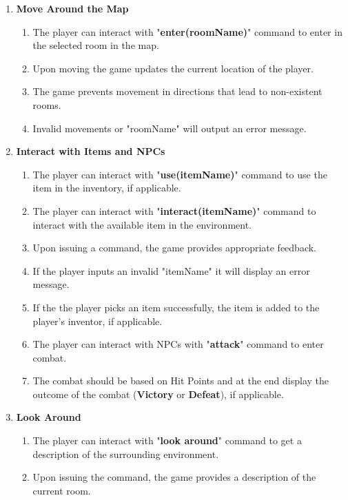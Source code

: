 \documentclass{article}
\begin{document}
\begin{enumerate}
    \item \textbf{Move Around the Map}
\begin{enumerate}
    \item The player can interact with "\textbf{enter(roomName)}" command to enter in the selected room in the map.
    \item Upon moving the game updates the current location of the player.
    \item The game prevents movement in directions that lead to non-existent rooms. 
    \item Invalid movements or "roomName" will output an error message.
\end{enumerate}

    \item \textbf{Interact with Items and NPCs}
\begin{enumerate}
    \item The player can interact with "\textbf{use(itemName)}" command to use the item in the inventory, if applicable.
    \item The player can interact with "\textbf{interact(itemName)}" command to interact with the available item in the environment.
    \item Upon issuing a command, the game provides appropriate feedback.
    \item If the player inputs an invalid "itemName" it will display an error message.
    \item If the the player picks an item successfully, the item is added to the player's inventor, if applicable. 
    \item The player can interact with NPCs with "\textbf{attack}" command to enter combat.
    \item The combat should be based on Hit Points and at the end display the outcome of the combat (\textbf{Victory} or \textbf{Defeat}), if applicable.
\end{enumerate}

    \item \textbf{Look Around}
\begin{enumerate}
    \item The player can interact with "\textbf{look around}" command to get a description of the surrounding environment.
    \item Upon issuing the command, the game provides a description of the current room.

\end{enumerate}


\end{enumerate}
\end{document}
